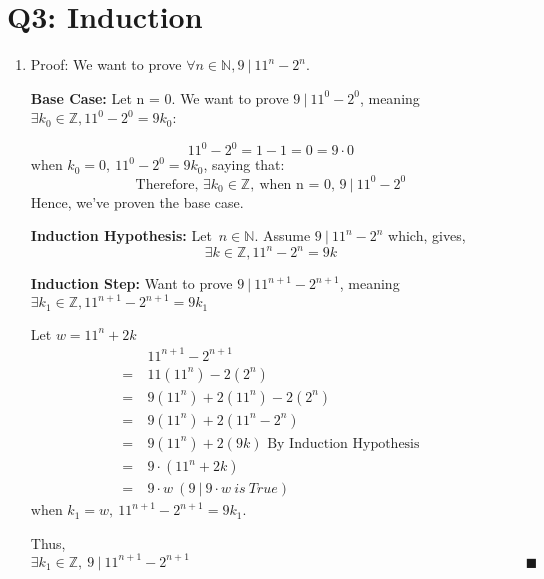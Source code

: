 \documentclass[12pt]{article}
\begin{document}
\section{Q3: Induction}
\begin{enumerate}[label=\alph*)]
    \item Proof:
We want to prove $\forall n \in \mathbb{N}, 9\ |\ 11^n - 2^n$.

\textbf{Base Case:} Let n = 0. We want to prove $ 9\ |\ 11^0 - 2^0$, meaning $\exists k_0 \in \mathbb{Z}, 11^0 - 2^0 = 9k_0$:
    
$$11^0 - 2^0 = 1 - 1 = 0 = 9 \cdot 0$$
$\text{when } k_0 = 0,\ 11^0 - 2^0 = 9k_0$, saying that:
$$\text{Therefore, } \exists k_0 \in \mathbb{Z}, \ \text{when n = 0, } 9\ |\ 11^0 - 2^0$$
Hence, we've proven the base case.
    
\textbf{Induction Hypothesis:} Let\ $n \in \mathbb{N}$. Assume $9\ |\ 11^n - 2^n$ which, gives, 
$$\exists k \in \mathbb{Z}, 11^n - 2^n = 9k$$

\textbf{Induction Step:} Want to prove $9\ |\ 11^{n+1} - 2^{n+1}$, meaning $\exists k_1 \in \mathbb{Z}, 11^{n+1} - 2^{n+1} = 9k_1$

Let $w = 11^n + 2k$
\begin{align*}
    &11^{n+1} - 2^{n+1} \\
    =\ &11(11^n) - 2(2^n) \\
    =\ &9(11^n) + 2(11^n) - 2(2^n) \\
    =\ &9(11^n) + 2(11^n - 2^n) \\
    =\ &9(11^n) + 2(9k)  \text{  By Induction Hypothesis}\\
    =\ &9 \cdot (11^n + 2k) \\
    =\ &9 \cdot w \ (9\ | \ 9\cdot w \ is \ True)
\end{align*}
$\text{when } k_1 = w,\ 11^{n+1} - 2^{n+1} = 9k_1$.

Thus, $\exists k_1 \in \mathbb{Z},\ 9\ |\ 11^{n+1} - 2^{n+1} \quad \quad \quad \quad \quad \quad \quad \quad \quad \quad \quad \quad \quad \quad \quad \quad \quad \quad \quad \quad \quad \quad \quad \quad \blacksquare $
\end{enumerate}

\newpage
\end{document}
